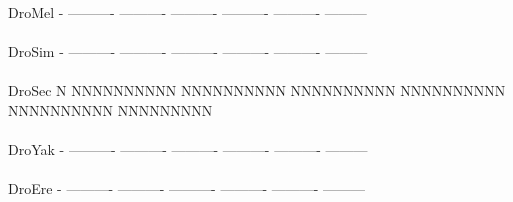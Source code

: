 \documentclass[11pt,twoside,reqno,a4paper]{article}
\begin{document}
{\\
DroMel	-	----------	----------	----------	----------	----------	---------\\
\hspace*{7\charwidth}\hspace*{1\charwidth}\hspace*{1\charwidth}\hspace*{1\charwidth}\hspace*{1\charwidth}\hspace*{1\charwidth}\hspace*{1\charwidth}\\
DroSim	-	----------	----------	----------	----------	----------	---------\\
\hspace*{7\charwidth}\hspace*{1\charwidth}\hspace*{1\charwidth}\hspace*{1\charwidth}\hspace*{1\charwidth}\hspace*{1\charwidth}\hspace*{1\charwidth}\\
DroSec	N	NNNNNNNNNN	NNNNNNNNNN	NNNNNNNNNN	NNNNNNNNNN	NNNNNNNNNN	NNNNNNNNN\\
\hspace*{7\charwidth}\hspace*{1\charwidth}\hspace*{1\charwidth}\hspace*{1\charwidth}\hspace*{1\charwidth}\hspace*{1\charwidth}\hspace*{1\charwidth}\\
DroYak	-	----------	----------	----------	----------	----------	---------\\
\hspace*{7\charwidth}\hspace*{1\charwidth}\hspace*{1\charwidth}\hspace*{1\charwidth}\hspace*{1\charwidth}\hspace*{1\charwidth}\hspace*{1\charwidth}\\
DroEre	-	----------	----------	----------	----------	----------	---------\\
\hspace*{7\charwidth}\hspace*{1\charwidth}\hspace*{1\charwidth}\hspace*{1\charwidth}\hspace*{1\charwidth}\hspace*{1\charwidth}\hspace*{1\charwidth}\\
}
\end{document}
